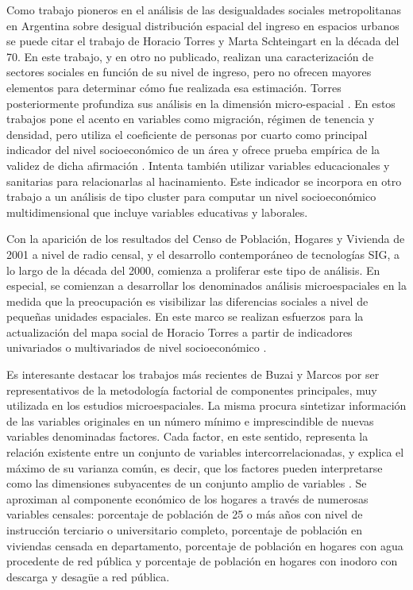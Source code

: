 Como trabajo pioneros en el análisis de las desigualdades sociales metropolitanas en Argentina sobre desigual distribución espacial del ingreso en espacios urbanos se puede citar el trabajo de Horacio Torres y Marta Schteingart  en la década del 70. En este trabajo, y en otro no publicado, realizan una caracterización de sectores sociales en función de su nivel de ingreso, pero no ofrecen mayores elementos para determinar cómo fue realizada esa estimación. Torres posteriormente profundiza sus análisis en la dimensión micro-espacial \cite{torres1975,torres1978}. En estos trabajos pone el acento en variables como migración, régimen de tenencia y densidad, pero utiliza el coeficiente de personas por cuarto como principal indicador del nivel socioeconómico de un área y ofrece prueba empírica de la validez de dicha afirmación \cite{torres1975}. Intenta también utilizar variables educacionales y sanitarias para relacionarlas al hacinamiento. Este indicador se incorpora en otro trabajo \cite{torres1978} a un análisis de tipo cluster para computar un nivel socioeconómico multidimensional que incluye variables educativas y laborales. 

Con la aparición de los resultados del Censo de Población, Hogares y Vivienda de 2001 a nivel de radio censal, y el desarrollo contemporáneo de tecnologías SIG, a lo largo de la década del 2000, comienza a proliferar este tipo de análisis. En especial, se comienzan a desarrollar los denominados análisis microespaciales en la medida que la preocupación es visibilizar las diferencias sociales a nivel de pequeñas unidades espaciales. En este marco se realizan esfuerzos para la  actualización del mapa social de Horacio Torres a partir de indicadores univariados o multivariados de nivel socioeconómico \cite{thuiller,groisman,marcos2011,marcos2015,buzaimarcos2014}.

Es interesante destacar los trabajos más recientes de Buzai y Marcos \cite{buzaimarcos2014,marcos2015} por ser representativos de la metodología factorial de componentes principales, muy utilizada en los estudios microespaciales. La misma procura sintetizar información de las variables originales en un número mínimo e imprescindible de nuevas variables denominadas factores. Cada factor, en este sentido, representa la relación existente entre un conjunto de variables intercorrelacionadas, y explica el máximo de su varianza común, es decir, que los factores pueden interpretarse como las dimensiones subyacentes de un conjunto amplio de variables \cite{marcos2015}.  Se aproximan al componente económico de los hogares a través de numerosas variables censales: porcentaje de población de 25 o más años con nivel de instrucción terciario o universitario completo, porcentaje de población en viviendas censada en departamento, porcentaje de población en hogares con agua procedente de red pública y porcentaje de población en hogares con inodoro con descarga y desagüe a red pública. 

